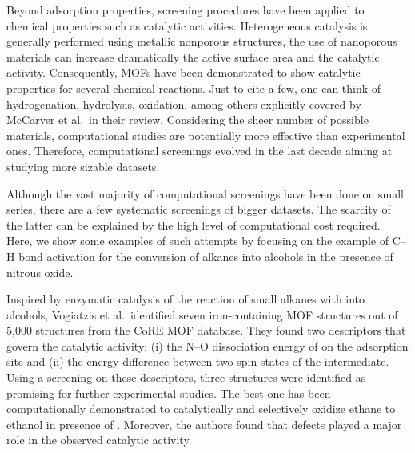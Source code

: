 \documentclass[main.tex]{subfiles}
\begin{document}
Beyond adsorption properties, screening procedures have been applied to chemical properties such as catalytic activities. Heterogeneous catalysis is generally performed using metallic nonporous structures, the use of nanoporous materials can increase dramatically the active surface area and the catalytic activity. Consequently, MOFs have been demonstrated to show catalytic properties for several chemical reactions. Just to cite a few, one can think of hydrogenation, hydrolysis, oxidation, among others explicitly covered by McCarver et al.\ in their review.\autocite{McCarver_2021}
Considering the sheer number of possible materials, computational studies are potentially more effective than experimental ones. Therefore, computational screenings evolved in the last decade aiming at studying more sizable datasets.

Although the vast majority of computational screenings have been done on small series, there are a few systematic screenings of bigger datasets. The scarcity of the latter can be explained by the high level of computational cost required. Here, we show some examples of such attempts by focusing on the example of C--H bond activation for the conversion of alkanes into alcohols in the presence of nitrous oxide.

Inspired by enzymatic catalysis of the reaction of small alkanes with  into alcohols, Vogiatzis et al.\ identified  seven iron-containing MOF structures out of 5,000 structures from the CoRE MOF database.\autocite{Vogiatzis_2016} They found two descriptors that govern the catalytic activity: (i) the N--O dissociation energy of  on the adsorption site and (ii) the energy difference between two spin states of the intermediate.
Using a screening on these descriptors, three structures were identified as promising for further experimental studies. The best one has been computationally demonstrated to catalytically and selectively oxidize ethane to ethanol in presence of . Moreover, the authors found that defects played a major role in the observed catalytic activity.
\end{document}
